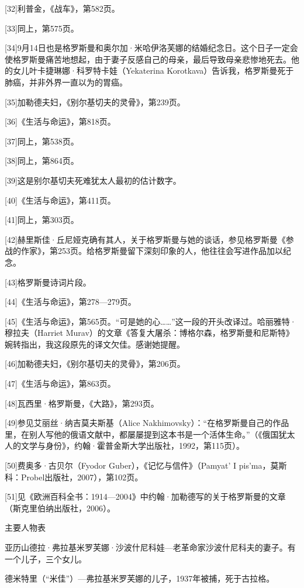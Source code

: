 [32]利普金，《战车》，第582页。

[33]同上，第575页。

[34]9月14日也是格罗斯曼和奥尔加·米哈伊洛芙娜的结婚纪念日。这个日子一定会使格罗斯曼痛苦地想起，由于妻子反感自己的母亲，最后导致母亲悲惨地死去。他的女儿叶卡捷琳娜·科罗特卡娃（Yekaterina Korotkava）告诉我，格罗斯曼死于肺癌，并非外界一直以为的胃癌。

[35]加勒德夫妇，《别尔基切夫的灵骨》，第239页。

[36]《生活与命运》，第818页。

[37]同上，第538页。

[38]同上，第864页。

[39]这是别尔基切夫死难犹太人最初的估计数字。

[40]《生活与命运》，第411页。

[41]同上，第303页。

[42]赫里斯佳·丘尼娅克确有其人，关于格罗斯曼与她的谈话，参见格罗斯曼《参战的作家》，第253页。给格罗斯曼留下深刻印象的人，他往往会写进作品加以纪念。

[43]格罗斯曼诗词片段。

[44]《生活与命运》，第278—279页。

[45]《生活与命运》，第565页。“可是她的心……”这一段的开头改译过。哈丽雅特·穆拉夫（Harriet Murav）的文章《答复大屠杀：博格尔森，格罗斯曼和尼斯特》婉转指出，我这段原先的译文欠佳。感谢她提醒。

[46]加勒德夫妇，《别尔基切夫的灵骨》，第206页。

[47]《生活与命运》，第863页。

[48]瓦西里·格罗斯曼，《大路》，第293页。

[49]参见艾丽丝·纳吉莫夫斯基（Alice Nakhimovsky）：“在格罗斯曼自己的作品里，在别人写他的俄语文献中，都屡屡提到这本书是一个活体生命。”（《俄国犹太人的文学与身份》，约翰·霍普金斯大学出版社，1992，第115页）。

[50]费奥多·古贝尔（Fyodor Guber），《记忆与信件》（Pamyat’ I pis’ma，莫斯科：Probel出版社，2007），第102页。

[51]见《欧洲百科全书：1914—2004》中约翰·加勒德写的关于格罗斯曼的文章（斯克里伯纳出版社，2006）。





主要人物表

亚历山德拉·弗拉基米罗芙娜·沙波什尼科娃—老革命家沙波什尼科夫的妻子。有一个儿子，三个女儿。

德米特里（“米佳”）—弗拉基米罗芙娜的儿子，1937年被捕，死于古拉格。

